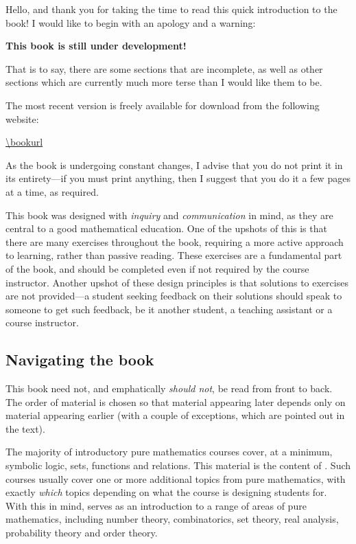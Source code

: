 Hello, and thank you for taking the time to read this quick introduction to the book! I would like to begin with an apology and a warning:
\begin{center}
\Large \color{red} \bf This book is still under development!
\end{center}
That is to say, there are some sections that are incomplete, as well as other sections which are currently much more terse than I would like them to be.

The most recent version is freely available for download from the following website:
\begin{center}
\url{\bookurl}
\end{center}
As the book is undergoing constant changes, I advise that you do not print it in its entirety---if you must print anything, then I suggest that you do it a few pages at a time, as required.

This book was designed with \textit{inquiry} and \textit{communication} in mind, as they are central to a good mathematical education. One of the upshots of this is that there are many exercises throughout the book, requiring a more active approach to learning, rather than passive reading. These exercises are a fundamental part of the book, and should be completed even if not required by the course instructor. Another upshot of these design principles is that solutions to exercises are not provided---a student seeking feedback on their solutions should speak to someone to get such feedback, be it another student, a teaching assistant or a course instructor.

\subsection*{Navigating the book}

This book need not, and emphatically \textit{should not}, be read from front to back. The order of material is chosen so that material appearing later depends only on material appearing earlier (with a couple of exceptions, which are pointed out in the text).

The majority of introductory pure mathematics courses cover, at a minimum, symbolic logic, sets, functions and relations. This material is the content of . Such courses usually cover one or more additional topics from pure mathematics, with exactly \textit{which} topics depending on what the course is designing students for. With this in mind,  serves as an introduction to a range of areas of pure mathematics, including number theory, combinatorics, set theory, real analysis, probability theory and order theory.

